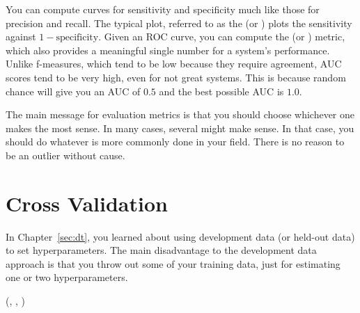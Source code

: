 You can compute curves for sensitivity and specificity much like those
for precision and recall.  The typical plot, referred to as the
 (or )
plots the sensitivity against $1 - \text{specificity}$.  Given an ROC
curve, you can compute the  (or
) metric, which also provides a meaningful single number
for a system's performance.  Unlike f-measures, which tend to be low
because they require agreement, AUC scores tend to be very high, even
for not great systems.  This is because random chance will give you an
AUC of $0.5$ and the best possible AUC is $1.0$.

The main message for evaluation metrics is that you should choose
whichever one makes the most sense.  In many cases, several might make
sense.  In that case, you should do whatever is more commonly done in
your field.  There is no reason to be an outlier without cause.

\section{Cross Validation}

In Chapter~\ref{sec:dt}, you learned about using development data (or
held-out data) to set hyperparameters.  The main disadvantage to the
development data approach is that you throw out some of your training
data, just for estimating one or two hyperparameters.

%
  {(, , )}
  {
\SETST{$\hat\ep$}{$\infty$}
\ENDFOR
{}
\SETST{$\hat\al$}{$\VARm{\al}$}
\ENDIF
\ENDFOR
}

